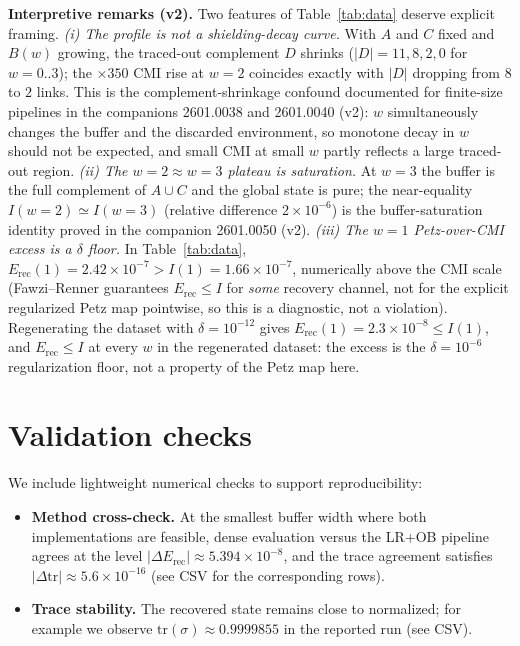 \documentclass[11pt]{article}
\begin{document}
\textbf{Interpretive remarks (v2).} Two features of Table~\ref{tab:data}
deserve explicit framing. \emph{(i) The profile is not a shielding-decay
curve.} With $A$ and $C$ fixed and $B(w)$ growing, the traced-out
complement $D$ shrinks ($|D| = 11, 8, 2, 0$ for $w = 0..3$); the
$\times 350$ CMI rise at $w = 2$ coincides exactly with $|D|$ dropping
from $8$ to $2$ links. This is the complement-shrinkage confound
documented for finite-size pipelines in the companions 2601.0038 and
2601.0040 (v2): $w$ simultaneously changes the buffer and the discarded
environment, so monotone decay in $w$ should not be expected, and small
CMI at small $w$ partly reflects a large traced-out region.
\emph{(ii) The $w = 2 \approx w = 3$ plateau is saturation.} At $w = 3$
the buffer is the full complement of $A \cup C$ and the global state is
pure; the near-equality $I(w{=}2) \simeq I(w{=}3)$ (relative difference
$2\times10^{-6}$) is the buffer-saturation identity proved in the
companion 2601.0050 (v2). \emph{(iii) The $w = 1$ Petz-over-CMI excess is a
$\delta$ floor.} In Table~\ref{tab:data}, $E_{\mathrm{rec}}(1) =
2.42\times10^{-7} > I(1) = 1.66\times10^{-7}$, numerically above the CMI scale (Fawzi--Renner guarantees
$E_{\mathrm{rec}} \le I$ for \emph{some} recovery channel, not for the
explicit regularized Petz map pointwise, so this is a diagnostic, not a
violation). Regenerating the
dataset with $\delta = 10^{-12}$ gives $E_{\mathrm{rec}}(1) =
2.3\times10^{-8} \le I(1)$, and $E_{\mathrm{rec}} \le I$ at every $w$ in
the regenerated dataset: the excess is the $\delta = 10^{-6}$
regularization floor, not a property of the Petz map here.

\section{Validation checks}

We include lightweight numerical checks to support reproducibility:
\begin{itemize}
\item \textbf{Method cross-check.} At the smallest buffer width where
both implementations are feasible, dense evaluation versus the LR+OB
pipeline agrees at the level $|\Delta E_{\mathrm{rec}}| \approx 5.394
\times 10^{-8}$, and the trace agreement satisfies $|\Delta\mathrm{tr}|
\approx 5.6\times10^{-16}$ (see CSV for the corresponding rows).
\item \textbf{Trace stability.} The recovered state remains close to
normalized; for example we observe $\mathrm{tr}(\sigma) \approx
0.9999855$ in the reported run (see CSV).
\end{itemize}
\end{document}
